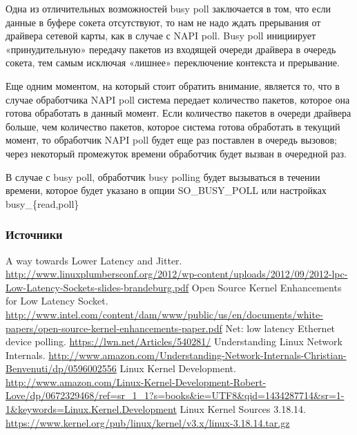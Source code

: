\documentclass[10pt, a5paper]{article}
\begin{document}
Одна из отличительных возможностей busy poll заключается в том, что если данные в буфере сокета отсутствуют, то нам не надо ждать прерывания от драйвера сетевой карты, как в случае с NAPI poll. Busy poll инициирует «принудительную» передачу пакетов из входящей очереди драйвера в очередь сокета, тем самым исключая «лишнее» переключение контекста и прерывание.

Еще одним моментом, на который стоит обратить внимание, является то, что в случае обработчика NAPI poll система передает количество пакетов, которое она готова обработать в данный момент. Если количество пакетов в очереди драйвера больше, чем количество пакетов, которое система готова обработать в текущий момент, то обработчик NAPI poll будет еще раз поставлен в очередь вызовов; через некоторый промежуток времени обработчик будет вызван в очередной раз.

В случае с busy poll, обработчик busy polling будет вызываться в течении времени, которое будет указано в опции SO\_BUSY\_POLL или настройках busy\_\{read,poll\}

\subsubsection*{Источники}

\begin{thebibliography}{9}
   {A way towards Lower Latency and Jitter.} \url{http://www.linuxplumbersconf.org/2012/wp-content/uploads/2012/09/2012-lpc-Low-Latency-Sockets-slides-brandeburg.pdf}
   {Open Source Kernel Enhancements for Low Latency Socket.} \url{http://www.intel.com/content/dam/www/public/us/en/documents/white-papers/open-source-kernel-enhancements-paper.pdf}
   {Net: low latency Ethernet device polling.} \url{https://lwn.net/Articles/540281/}
   {Understanding Linux Network Internals.} \url{http://www.amazon.com/Understanding-Network-Internals-Christian-Benvenuti/dp/0596002556}
   {Linux Kernel Development.} \url{http://www.amazon.com/Linux-Kernel-Development-Robert-Love/dp/0672329468/ref=sr_1_1?s=books&ie=UTF8&qid=1434287714&sr=1-1&keywords=Linux.Kernel.Development}
   {Linux Kernel Sources 3.18.14.} \url{https://www.kernel.org/pub/linux/kernel/v3.x/linux-3.18.14.tar.gz}
\end{thebibliography}
\end{document}

